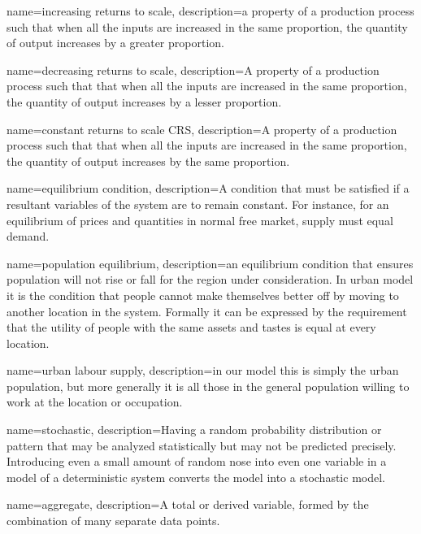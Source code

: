 {
name=increasing returns to scale,
description={a property of a production process  such that when all the inputs are increased in the same proportion, the quantity of \gls{output} increases by a greater proportion.}
}

{
name=decreasing returns to scale,
description={A property of a production process such that that when all the inputs are increased in the same proportion, the quantity of \gls{output} increases by a lesser proportion.}
}

{
name=constant returns to scale \gls{CRS},
description={A property of a production process such that that when all
the \glspl{input} are increased in the same proportion, the quantity of \gls{output} increases by the same proportion.}
}

{
name=equilibrium condition,
description={A condition that must be satisfied if a resultant variables of the system are to remain constant. For instance, for an equilibrium of prices and quantities in normal free \gls{market}, supply must equal demand.} %
}

{
name=population equilibrium,
description={an \gls{equilibrium condition} that ensures population will not rise or fall  for the region under consideration. In urban model it is the condition that people cannot make themselves better off by moving to another location in the system. Formally it can be expressed by the requirement that the utility of people with the same  assets and tastes is equal at every location. }
}

{
name=urban labour supply,
description={in our model this is simply the urban population, but more generally it is all those in the general population willing to work at the location or occupation.}
}

{
name=stochastic,
description={Having a random probability distribution or pattern that may be analyzed statistically but may not be predicted precisely. Introducing even a small amount of random nose into even one variable in a model of a deterministic system converts the model into a stochastic model.}
}

{
name=aggregate,
description={A total or derived variable, formed by the combination of many separate data points.}
}

